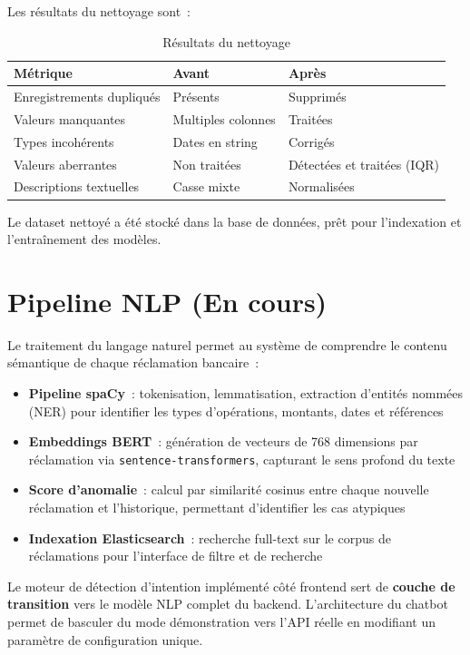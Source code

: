 \documentclass[12pt,a4paper]{report}
\begin{document}
\noindent Les résultats du nettoyage sont~:

\begin{table}[H]
\centering
\caption{Résultats du nettoyage}
\begin{tabularx}{\textwidth}{|X|l|l|}
\hline
\textbf{Métrique} & \textbf{Avant} & \textbf{Après} \\
\hline
Enregistrements dupliqués & Présents & Supprimés \\
\hline
Valeurs manquantes & Multiples colonnes & Traitées \\
\hline
Types incohérents & Dates en string & Corrigés \\
\hline
Valeurs aberrantes & Non traitées & Détectées et traitées (IQR) \\
\hline
Descriptions textuelles & Casse mixte & Normalisées \\
\hline
\end{tabularx}
\end{table}

Le dataset nettoyé a été stocké dans la base de données, prêt pour l'indexation et l'entraînement des modèles.

\section{Pipeline NLP (En cours)}

Le traitement du langage naturel permet au système de comprendre le contenu sémantique de chaque réclamation bancaire~:

\begin{itemize}[noitemsep]
    \item \textbf{Pipeline spaCy}~: tokenisation, lemmatisation, extraction d'entités nommées (NER) pour identifier les types d'opérations, montants, dates et références
    \item \textbf{Embeddings BERT}~: génération de vecteurs de 768 dimensions par réclamation via \texttt{sentence-transformers}, capturant le sens profond du texte
    \item \textbf{Score d'anomalie}~: calcul par similarité cosinus entre chaque nouvelle réclamation et l'historique, permettant d'identifier les cas atypiques
    \item \textbf{Indexation Elasticsearch}~: recherche full-text sur le corpus de réclamations pour l'interface de filtre et de recherche
\end{itemize}

Le moteur de détection d'intention implémenté côté frontend sert de \textbf{couche de transition} vers le modèle NLP complet du backend. L'architecture du chatbot permet de basculer du mode démonstration vers l'API réelle en modifiant un paramètre de configuration unique.
\end{document}
